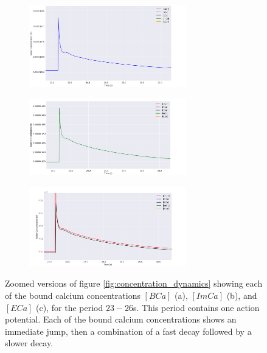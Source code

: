 \documentclass[a4paper,12pt]{article}
\theoremstyle{definition}
\begin{document}
\begin{figure}[p]
  \begin{subfigure}{\textwidth}
    \centering
    \includegraphics[width=0.75\textwidth]{figures/concentration_dynamics_18_zoomed_BCa.png}
    \caption{}
  \end{subfigure}
  \begin{subfigure}{\textwidth}
    \centering
    \includegraphics[width=0.75\textwidth]{figures/concentration_dynamics_18_zoomed_ImCa.png}
    \caption{}
  \end{subfigure}
  \begin{subfigure}{\textwidth}
    \centering
    \includegraphics[width=0.75\textwidth]{figures/concentration_dynamics_18_zoomed_ECa.png}
    \caption{}
  \end{subfigure}
  \caption{Zoomed versions of figure \ref{fig:concentration_dynamics} showing each of the bound calcium concentrations $[BCa]$ (a), $[ImCa]$ (b), and $[ECa]$ (c), for the period $23 - 26$s. This period contains one action potential. Each of the bound calcium concentrations shows an immediate jump, then a combination of a fast decay followed by a slower decay.}
  \label{fig:concentration_dynamics_zoomed}
\end{figure}
\end{document}
